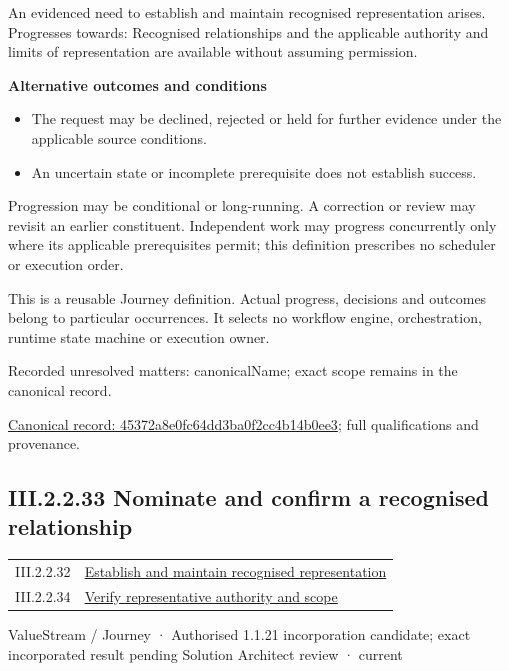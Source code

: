 An evidenced need to establish and maintain recognised representation arises. Progresses towards: Recognised relationships and the applicable authority and limits of representation are available without assuming permission.



\par\medskip\textbf{Alternative outcomes and conditions}\par


\begin{itemize}


\item The request may be declined, rejected or held for further evidence under the applicable source conditions.

\item An uncertain state or incomplete prerequisite does not establish success.

\end{itemize}


Progression may be conditional or long-running. A correction or review may revisit an earlier constituent. Independent work may progress concurrently only where its applicable prerequisites permit; this definition prescribes no scheduler or execution order.



This is a reusable Journey definition. Actual progress, decisions and outcomes belong to particular occurrences. It selects no workflow engine, orchestration, runtime state machine or execution owner.


{\small Recorded unresolved matters: canonicalName; exact scope remains in the canonical record.}\par
{\footnotesize \href{../../../../continuum/strategy/value-stream/45372a8e0fc64dd3ba0f2cc4b14b0ee3.md}{Canonical record: 45372a8e0fc64dd3ba0f2cc4b14b0ee3}; full qualifications and provenance.}\par
\subsection*{III.2.2.33 Nominate and confirm a recognised relationship}
\label{navigation:III.2.2.33}

\begin{longtable}{p{.22\linewidth}p{.73\linewidth}}
III.2.2.32 & \hyperref[element:45372a8e0fc64dd3ba0f2cc4b14b0ee3]{Establish and maintain recognised representation} \\
III.2.2.34 & \hyperref[element:ee60990709724506905c5dbe8e21261a]{Verify representative authority and scope} \\
\end{longtable}
\label{element:d481668c85ab429981ce97bba2fd6e9a}
{\small ValueStream / Journey · Authorised 1.1.21 incorporation candidate; exact incorporated result pending Solution Architect review · current}\par

